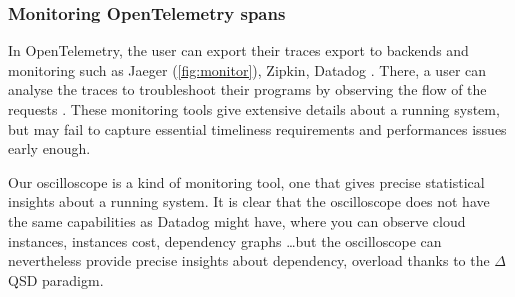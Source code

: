     \subsubsection{Monitoring OpenTelemetry spans}
        In OpenTelemetry, the user can export their traces export to backends and monitoring such as Jaeger (\cref{fig:monitor}), Zipkin, Datadog \cite{otel-exp}. There, a user can analyse the traces to troubleshoot their programs by observing the flow of the requests \cite{jg}. These monitoring tools give extensive details about a running system, but may fail to capture essential timeliness requirements and performances issues early enough.
        
        Our oscilloscope is a kind of monitoring tool, one that gives precise statistical insights about a running system. It is clear that the oscilloscope does not have the same capabilities as Datadog \cite{datadog} might have, where you can observe cloud instances, instances cost, dependency graphs \dots but the oscilloscope can nevertheless provide precise insights about dependency, overload thanks to the $\Delta$QSD paradigm. 

